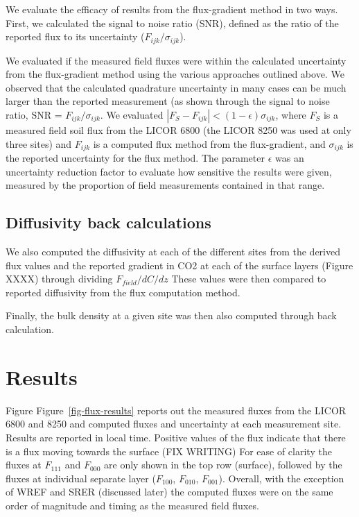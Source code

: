 \documentclass[
  letterpaper,
  DIV=11,
  numbers=noendperiod]{scrartcl}
\begin{document}
We evaluate the efficacy of results from the flux-gradient method in two
ways. First, we calculated the signal to noise ratio (SNR), defined as
the ratio of the reported flux to its uncertainty
(\(F_{ijk}/\sigma_{ijk}\)).

We evaluated if the measured field fluxes were within the calculated
uncertainty from the flux-gradient method using the various approaches
outlined above. We observed that the calculated quadrature uncertainty
in many cases can be much larger than the reported measurement (as shown
through the signal to noise ratio, SNR = \(F_{ijk}/\sigma_{ijk}\). We
evaluated \(| F_{S} - F_{ijk} | < (1-\epsilon) \sigma_{ijk}\), where
\(F_{S}\) is a measured field soil flux from the LICOR 6800 (the LICOR
8250 was used at only three sites) and \(F_{ijk}\) is a computed flux
method from the flux-gradient, and \(\sigma_{ijk}\) is the reported
uncertainty for the flux method. The parameter \(\epsilon\) was an
uncertainty reduction factor to evaluate how sensitive the results were
given, measured by the proportion of field measurements contained in
that range.

\subsection{Diffusivity back
calculations}\label{diffusivity-back-calculations}

We also computed the diffusivity at each of the different sites from the
derived flux values and the reported gradient in CO2 at each of the
surface layers (Figure XXXX) through dividing \(F_{field}/dC/dz\) These
values were then compared to reported diffusivity from the flux
computation method.

Finally, the bulk density at a given site was then also computed through
back calculation.

\section{Results}\label{results}

Figure Figure~\ref{fig-flux-results} reports out the measured fluxes
from the LICOR 6800 and 8250 and computed fluxes and uncertainty at each
measurement site. Results are reported in local time. Positive values of
the flux indicate that there is a flux moving towards the surface (FIX
WRITING) For ease of clarity the fluxes at \(F_{111}\) and \(F_{000}\)
are only shown in the top row (surface), followed by the fluxes at
individual separate layer (\(F_{100}\), \(F_{010}\), \(F_{001}\)).
Overall, with the exception of WREF and SRER (discussed later) the
computed fluxes were on the same order of magnitude and timing as the
measured field fluxes.
\end{document}

